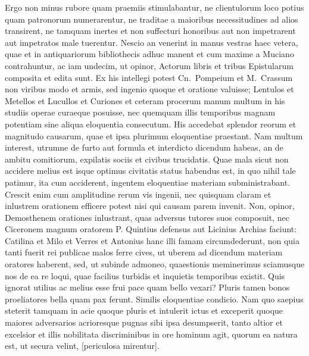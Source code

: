 Ergo non minus rubore quam praemiis stimulabantur, ne clientulorum loco potius quam patronorum numerarentur, ne traditae a maioribus necessitudines ad alios transirent, ne tamquam inertes et non suffecturi honoribus aut non impetrarent aut impetratos male tuerentur. Nescio an venerint in manus vestras haec vetera, quae et in antiquariorum bibliothecis adhuc manent et cum maxime a Muciano contrahuntur, ac iam undecim, ut opinor, Actorum libris et tribus Epistularum composita et edita sunt. Ex his intellegi potest Cn.~Pompeium et M.~Crassum non viribus modo et armis, sed ingenio quoque et oratione valuisse; Lentulos et Metellos et Lucullos et Curiones et ceteram procerum manum multum in his studiis operae curaeque posuisse, nec quemquam illis temporibus magnam potentiam sine aliqua eloquentia consecutum. His accedebat splendor reorum et magnitudo causarum, quae et ipsa plurimum eloquentiae praestant. Nam multum interest, utrumne de furto aut formula et interdicto dicendum habeas, an de ambitu comitiorum, expilatis sociis et civibus trucidatis. Quae mala sicut non accidere melius est isque optimus civitatis status habendus est, in quo nihil tale patimur, ita cum acciderent, ingentem eloquentiae materiam subministrabant. Crescit enim cum amplitudine rerum vis ingenii, nec quisquam claram et inlustrem orationem efficere potest nisi qui causam parem invenit. Non, opinor, Demosthenem orationes inlustrant, quas adversus tutores suos composuit, nec Ciceronem magnum oratorem P. Quintius defensus aut Licinius Archias faciunt: Catilina et Milo et Verres et Antonius hanc illi famam circumdederunt, non quia tanti fuerit rei publicae malos ferre cives, ut uberem ad dicendum materiam oratores haberent, sed, ut subinde admoneo, quaestionis meminerimus sciamusque nos de ea re loqui, quae facilius turbidis et inquietis temporibus existit. Quis ignorat utilius ac melius esse frui pace quam bello vexari? Pluris tamen bonos proeliatores bella quam pax ferunt. Similis eloquentiae condicio. Nam quo saepius steterit tamquam in acie quoque pluris et intulerit ictus et exceperit quoque maiores adversarios acrioresque pugnas sibi ipsa desumpserit, tanto altior et excelsior et illis nobilitata discriminibus in ore hominum agit, quorum ea natura est, ut secura velint, [periculosa mirentur].

